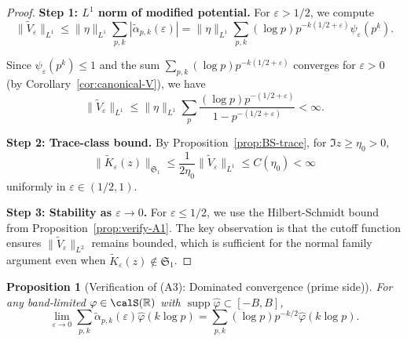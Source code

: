 ﻿\documentclass[12pt,a4paper]{article}
\newtheorem{proposition}[theorem]{Proposition}
\theoremstyle{definition}
\theoremstyle{remark}
\newcommand{\RR}{\mathbb{R}}
\newcommand{\supp}{\operatorname{supp}}
\begin{document}
\begin{proof}
\textbf{Step 1: $L^1$ norm of modified potential.}
For $\varepsilon > 1/2$, we compute
\[
  \|\widetilde{V}_\varepsilon\|_{L^1} \leq \|\eta\|_{L^1} \sum_{p,k} |\widetilde{\alpha}_{p,k}(\varepsilon)| = \|\eta\|_{L^1} \sum_{p,k} (\log p) p^{-k(1/2+\varepsilon)} \psi_\varepsilon(p^k).
\]

Since $\psi_\varepsilon(p^k) \leq 1$ and the sum $\sum_{p,k} (\log p) p^{-k(1/2+\varepsilon)}$ converges for $\varepsilon > 0$ (by Corollary~\ref{cor:canonical-V}), we have
\[
  \|\widetilde{V}_\varepsilon\|_{L^1} \leq \|\eta\|_{L^1} \sum_p \frac{(\log p) p^{-(1/2+\varepsilon)}}{1-p^{-(1/2+\varepsilon)}} < \infty.
\]

\textbf{Step 2: Trace-class bound.}
By Proposition~\ref{prop:BS-trace}, for $\Im z \geq \eta_0 > 0$,
\[
  \|\widetilde{K}_\varepsilon(z)\|_{\mathfrak{S}_1} \leq \frac{1}{2\eta_0} \|\widetilde{V}_\varepsilon\|_{L^1} \leq C(\eta_0) < \infty
\]
uniformly in $\varepsilon \in (1/2, 1)$.

\textbf{Step 3: Stability as $\varepsilon \to 0$.}
For $\varepsilon \leq 1/2$, we use the Hilbert-Schmidt bound from Proposition~\ref{prop:verify-A1}. The key observation is that the cutoff function ensures $\|\widetilde{V}_\varepsilon\|_{L^2}$ remains bounded, which is sufficient for the normal family argument even when $\widetilde{K}_\varepsilon(z) \notin \mathfrak{S}_1$.
\end{proof}

\begin{proposition}[Verification of (A3): Dominated convergence (prime side)]\label{prop:verify-A3}
For any band-limited $\varphi \in \calS(\RR)$ with $\supp \widehat{\varphi} \subset [-B, B]$,
\[
  \lim_{\varepsilon \to 0} \sum_{p,k} \widetilde{\alpha}_{p,k}(\varepsilon) \widehat{\varphi}(k\log p) = \sum_{p,k} (\log p) p^{-k/2} \widehat{\varphi}(k\log p).
\]
\end{proposition}
\end{document}
